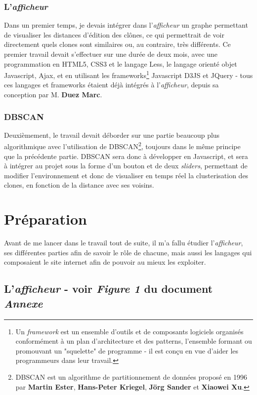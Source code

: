 \documentclass[12pt]{report}
\begin{document}
\begin{spacing}{1.2}
\subsection{L'\textit{afficheur}}
Dans un premier temps, je devais intégrer dans l'\textit{afficheur} un graphe permettant de visualiser les distances d'édition des clônes, ce qui permettrait de voir directement quels clones sont similaires ou, au contraire, très différents.
\newline
Ce premier travail devait s'effectuer sur une durée de deux mois, avec une programmation en HTML5, CSS3 et le langage Less, le langage orienté objet Javascript, Ajax, et en utilisant les frameworks\footnote{Un \textit{framework} est un ensemble d'outils et de composants logiciels organisés conformément à un plan d'architecture et des patterns, l'ensemble formant ou promouvant un "squelette" de programme - il est conçu en vue d'aider les programmeurs dans leur travail.} Javascript D3JS et JQuery - tous ces langages et frameworks étaient déjà intégrés à l'\textit{afficheur}, depuis sa conception par M. \textbf{Duez Marc}.

\subsection{DBSCAN}
Deuxièmement, le travail devait déborder sur une partie beaucoup plus algorithmique avec l'utilisation de DBSCAN\footnote{DBSCAN est un algorithme de partitionnement de données proposé en 1996 par \textbf{Martin Ester}, \textbf{Hans-Peter Kriegel}, \textbf{Jörg Sander} et \textbf{Xiaowei Xu}.}, toujours dans le même principe que la précédente partie.
\newline
DBSCAN sera donc à développer en Javascript, et sera à intégrer au projet sous la forme d'un bouton et de deux \textit{sliders}, permettant de modifier l'environnement et donc de visualiser en temps réel la clusterisation des clones, en fonction de la distance avec ses voisins.

\chapter{Préparation}

Avant de me lancer dans le travail tout de suite, il m'a fallu étudier l'\textit{afficheur}, ses différentes parties afin de savoir le rôle de chacune, mais aussi les langages qui composaient le site internet afin de pouvoir au mieux les exploiter.

\section{L'\textit{afficheur}  - voir \textit{Figure 1} du document \textit{Annexe}}


\end{spacing}
\end{document}
